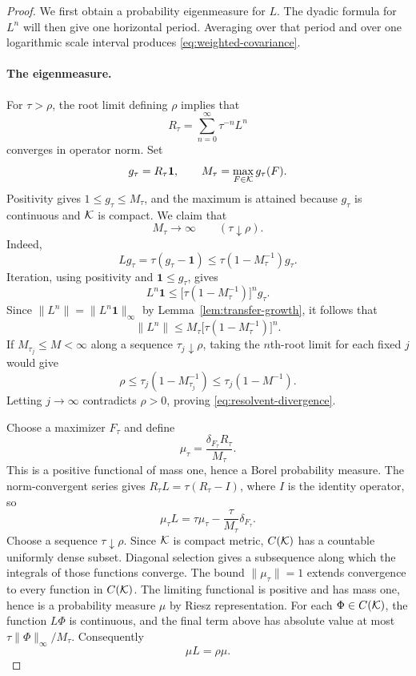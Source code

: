 \begin{proof}
We first obtain a probability eigenmeasure for $L$.  The dyadic formula for
$L^n$ will then give one horizontal period.  Averaging over that period and
over one logarithmic scale interval produces
\eqref{eq:weighted-covariance}.

\paragraph{The eigenmeasure.}
For $\tau>\rho$, the root limit defining $\rho$ implies that
\[
 R_\tau=\sum_{n=0}^{\infty}\tau^{-n}L^n
\]
converges in operator norm.  Set
\[
 g_\tau=R_\tau\mathbf 1,
 \qquad M_\tau=\max_{F\in\mathcal K}g_\tau(F).
\]
Positivity gives $1\leq g_\tau\leq M_\tau$, and the maximum is attained
because $g_\tau$ is continuous and $\mathcal K$ is compact.  We claim that
\begin{equation}
 M_\tau\longrightarrow\infty\qquad(\tau\downarrow\rho).
 \label{eq:resolvent-divergence}
\end{equation}
Indeed,
\[
 Lg_\tau=\tau(g_\tau-\mathbf 1)
 \leq\tau(1-M_\tau^{-1})g_\tau.
\]
Iteration, using positivity and $\mathbf 1\leq g_\tau$, gives
\[
 L^n\mathbf 1
 \leq\bigl[\tau(1-M_\tau^{-1})\bigr]^n g_\tau.
\]
Since $\|L^n\|=\|L^n\mathbf 1\|_\infty$ by
Lemma~\ref{lem:transfer-growth}, it follows that
\[
 \|L^n\|\leq M_\tau
      \bigl[\tau(1-M_\tau^{-1})\bigr]^n.
\]
If $M_{\tau_j}\leq M<\infty$ along a sequence $\tau_j\downarrow\rho$,
taking the $n$th-root limit for each fixed $j$ would give
\[
 \rho\leq\tau_j(1-M_{\tau_j}^{-1})
       \leq\tau_j(1-M^{-1}).
\]
Letting $j\to\infty$ contradicts $\rho>0$, proving
\eqref{eq:resolvent-divergence}.

Choose a maximizer $F_\tau$ and define
\[
 \mu_\tau=\frac{\delta_{F_\tau}R_\tau}{M_\tau}.
\]
This is a positive functional of mass one, hence a Borel probability measure.
The norm-convergent series gives $R_\tau L=\tau(R_\tau-I)$, where $I$ is
the identity operator, so
\[
 \mu_\tau L=\tau\mu_\tau-
                \frac{\tau}{M_\tau}\delta_{F_\tau}.
\]
Choose a sequence $\tau\downarrow\rho$.  Since $\mathcal K$ is compact metric,
$C(\mathcal K)$ has a countable uniformly dense subset.  Diagonal selection gives
a subsequence along which the integrals of those functions converge.
The bound $\|\mu_\tau\|=1$ extends convergence to every function in
$C(\mathcal K)$.  The limiting functional is positive and has mass one, hence is
a probability measure $\mu$ by Riesz representation.  For each
$\Phi\in C(\mathcal K)$, the function $L\Phi$ is continuous, and the final term
above has absolute value at most $\tau\|\Phi\|_\infty/M_\tau$.
Consequently
\begin{equation}
 \mu L=\rho\mu.
 \label{eq:transfer-eigenmeasure}
\end{equation}


\end{proof}
